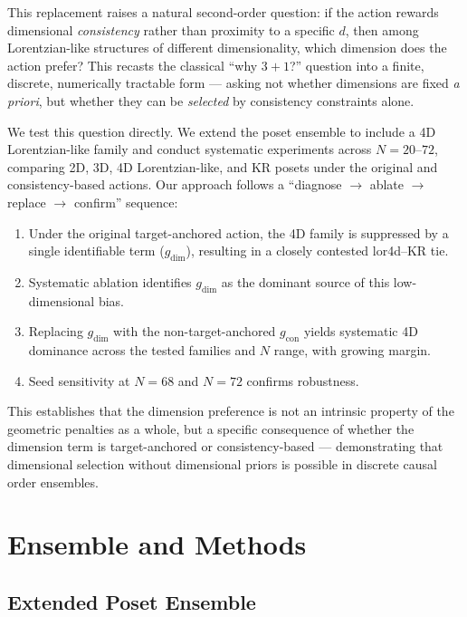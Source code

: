 \documentclass[entropy,article,submit,pdftex,moreauthors]{Definitions/mdpi}
\begin{document}
This replacement raises a natural second-order question: if the action rewards dimensional \emph{consistency} rather than proximity to a specific $d$, then among Lorentzian-like structures of different dimensionality, which dimension does the action prefer? This recasts the classical ``why $3{+}1$?'' question into a finite, discrete, numerically tractable form --- asking not whether dimensions are fixed \emph{a priori}, but whether they can be \emph{selected} by consistency constraints alone.

We test this question directly. We extend the poset ensemble to include a 4D Lorentzian-like family and conduct systematic experiments across $N = 20$--$72$, comparing 2D, 3D, 4D Lorentzian-like, and KR posets under the original and consistency-based actions. Our approach follows a ``diagnose $\to$ ablate $\to$ replace $\to$ confirm'' sequence:

\begin{enumerate}[nosep]
    \item Under the original target-anchored action, the 4D family is suppressed by a single identifiable term ($g_{\text{dim}}$), resulting in a closely contested lor4d--KR tie.
    \item Systematic ablation identifies $g_{\text{dim}}$ as the dominant source of this low-dimensional bias.
    \item Replacing $g_{\text{dim}}$ with the non-target-anchored $g_{\text{con}}$ yields systematic 4D dominance across the tested families and $N$ range, with growing margin.
    \item Seed sensitivity at $N = 68$ and $N = 72$ confirms robustness.
\end{enumerate}

This establishes that the dimension preference is not an intrinsic property of the geometric penalties as a whole, but a specific consequence of whether the dimension term is target-anchored or consistency-based --- demonstrating that dimensional selection without dimensional priors is possible in discrete causal order ensembles.

\section{Ensemble and Methods}

\subsection{Extended Poset Ensemble}
\end{document}
